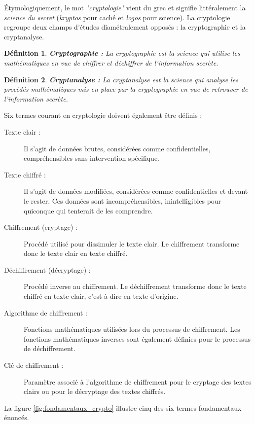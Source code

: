 \documentclass[oneside]{book}
\newtheorem{definition}{Définition}[section]
\begin{document}
Étymologiquement, le mot \textit{"cryptologie"} vient du grec et signifie littéralement la \textit{science du secret} (\textit{kryptos}  pour caché et \textit{logos} pour science). La cryptologie regroupe deux champs d'études diamétralement opposés : la cryptographie et la cryptanalyse.

\theoremstyle{definition}
\begin{definition}{\textbf{Cryptographie : }}
La cryptographie est la science qui utilise les mathématiques en vue de chiffrer et déchiffrer de l'information secrète.
\end{definition}

\begin{definition}{\textbf{Cryptanalyse : }}
La cryptanalyse est la science qui analyse les procédés mathématiques mis en place par la cryptographie en vue de retrouver de l'information secrète. 
\end{definition}

\hspace{-0.5cm}Six termes courant en cryptologie doivent également être définis : 
\begin{description}
\item[Texte clair :] Il s'agit de données brutes, considérées comme confidentielles, compréhensibles sans intervention spécifique.
\item[Texte chiffré :] Il s'agit de données modifiées, considérées comme confidentielles et devant le rester. Ces données sont incompréhensibles, inintelligibles pour quiconque qui tenterait de les comprendre. 
\item[Chiffrement (cryptage) :] Procédé utilisé pour dissimuler le texte clair. Le chiffrement transforme donc le texte clair en texte chiffré.
\item[Déchiffrement (décryptage) :] Procédé inverse au chiffrement. Le déchiffrement transforme donc le texte chiffré en texte clair, c'est-à-dire en texte d'origine.
\item[Algorithme de chiffrement :] Fonctions mathématiques utilisées lors du processus de chiffrement. Les fonctions mathématiques inverses sont également définies pour le processus de déchiffrement.
\item[Clé de chiffrement :] Paramètre associé à l'algorithme de chiffrement pour le cryptage des textes clairs ou pour le décryptage des textes chiffrés.
\end{description}

\hspace{-0.5cm}La figure \ref{fig:fondamentaux_crypto} illustre cinq des six termes fondamentaux énoncés.
\end{document}
